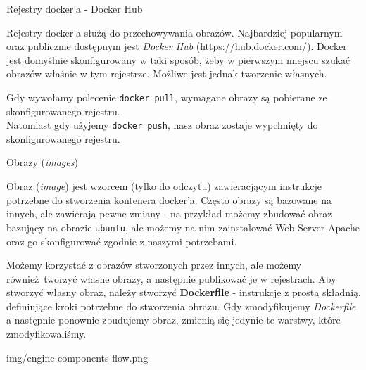 \documentclass[aspectratio=169]{beamer}
\begin{document}
\begin{frame}{Rejestry docker'a - Docker Hub}
    \begin{card}
        Rejestry docker'a służą do przechowywania obrazów. Najbardziej popularnym oraz publicznie dostępnym jest \textit{Docker Hub} (\url{https://hub.docker.com/}).
        Docker jest domyślnie skonfigurowany w taki sposób, żeby w pierwszym miejscu szukać obrazów właśnie w tym rejestrze. Możliwe jest jednak tworzenie własnych.
    \end{card}
    \begin{card}
        Gdy wywołamy polecenie \colorbox{dark-gray}{\lstinline{docker pull}}, wymagane obrazy są pobierane ze skonfigurowanego rejestru.\\
        Natomiast gdy użyjemy \colorbox{dark-gray}{\lstinline{docker push}}, nasz obraz zostaje wypchnięty do skonfigurowanego rejestru.
    \end{card}
\end{frame}

\begin{frame}{Obrazy (\textit{images})}
    \begin{card}
        Obraz (\textit{image}) jest wzorcem (tylko do odczytu) zawieracjącym instrukcje potrzebne do stworzenia kontenera docker'a.
        Często obrazy są bazowane na innych, ale zawierają pewne zmiany - na przykład możemy zbudować obraz bazujący na obrazie \colorbox{dark-gray}{\lstinline{ubuntu}}, ale możemy na nim zainstalować Web Server Apache oraz go skonfigurować zgodnie z naszymi potrzebami.
    \end{card}
    \begin{card}
        Możemy korzystać z obrazów stworzonych przez innych, ale możemy również tworzyć własne obrazy, a następnie publikować je w rejestrach. Aby stworzyć własny obraz, należy stworzyć \textbf{Dockerfile} - instrukcje z prostą składnią, definiujące kroki potrzebne do stworzenia obrazu. Gdy zmodyfikujemy \textit{Dockerfile} a następnie ponownie zbudujemy obraz, zmienią się jedynie te warstwy, które zmodyfikowaliśmy.
    \end{card}

\end{frame}

\begin{frameImg}[\textwidth]{img/engine-components-flow.png}
\end{frameImg}
\end{document}
